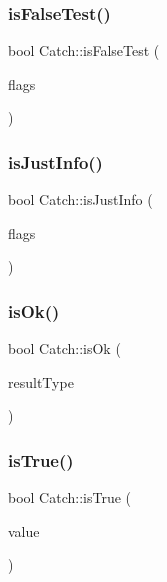 \mbox{\label{namespaceCatch_a93ef4e3e307a2021ca0d41b32c0e54b0}} 
\subsubsection{\texorpdfstring{is\+False\+Test()}{isFalseTest()}}
{\footnotesize\ttfamily bool Catch\+::is\+False\+Test (\begin{DoxyParamCaption}\item[{int}]{flags }\end{DoxyParamCaption})}

\mbox{\label{namespaceCatch_a54b01af61673a3e1f21f31713639b180}} 
\subsubsection{\texorpdfstring{is\+Just\+Info()}{isJustInfo()}}
{\footnotesize\ttfamily bool Catch\+::is\+Just\+Info (\begin{DoxyParamCaption}\item[{int}]{flags }\end{DoxyParamCaption})}

\mbox{\label{namespaceCatch_a5205869c81c06d3460759cb86676ae68}} 
\subsubsection{\texorpdfstring{is\+Ok()}{isOk()}}
{\footnotesize\ttfamily bool Catch\+::is\+Ok (\begin{DoxyParamCaption}\item[{\mbox{\hyperlink{structCatch_1_1ResultWas_a624e1ee3661fcf6094ceef1f654601ef}{Result\+Was\+::\+Of\+Type}}}]{result\+Type }\end{DoxyParamCaption})}

\mbox{\label{namespaceCatch_ae3bc6c6677e64e6eaa720dc3add31852}} 
\subsubsection{\texorpdfstring{is\+True()}{isTrue()}}
{\footnotesize\ttfamily bool Catch\+::is\+True (\begin{DoxyParamCaption}\item[{bool}]{value }\end{DoxyParamCaption})}

